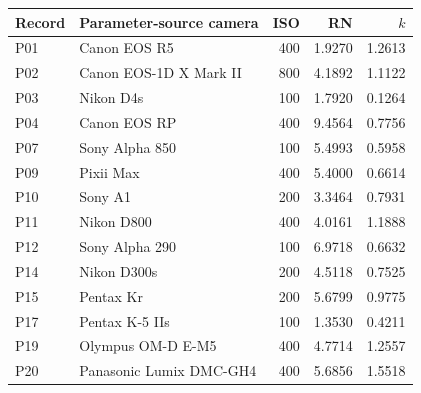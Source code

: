 \begin{inlinetable}
\centering
\caption{PTC parameters for Fig.~\ref{fig:ptc} (read noise RN in DN, conversion gain $k$ in DN/electron).}\label{tab:ptc}
\footnotesize
\renewcommand{\arraystretch}{0.82}
\setlength{\tabcolsep}{3pt}
\begin{tabular}{llrrr}
\toprule
Record & Parameter-source camera & ISO & RN & $k$ \\
\midrule
P01 & Canon EOS R5 & 400 & 1.9270 & 1.2613 \\
P02 & Canon EOS-1D X Mark II & 800 & 4.1892 & 1.1122 \\
P03 & Nikon D4s & 100 & 1.7920 & 0.1264 \\
P04 & Canon EOS RP & 400 & 9.4564 & 0.7756 \\
P07 & Sony Alpha 850 & 100 & 5.4993 & 0.5958 \\
P09 & Pixii Max & 400 & 5.4000 & 0.6614 \\
P10 & Sony A1 & 200 & 3.3464 & 0.7931 \\
P11 & Nikon D800 & 400 & 4.0161 & 1.1888 \\
P12 & Sony Alpha 290 & 100 & 6.9718 & 0.6632 \\
P14 & Nikon D300s & 200 & 4.5118 & 0.7525 \\
P15 & Pentax Kr & 200 & 5.6799 & 0.9775 \\
P17 & Pentax K-5 IIs & 100 & 1.3530 & 0.4211 \\
P19 & Olympus OM-D E-M5 & 400 & 4.7714 & 1.2557 \\
P20 & Panasonic Lumix DMC-GH4 & 400 & 5.6856 & 1.5518 \\
\bottomrule
\end{tabular}
\end{inlinetable}
